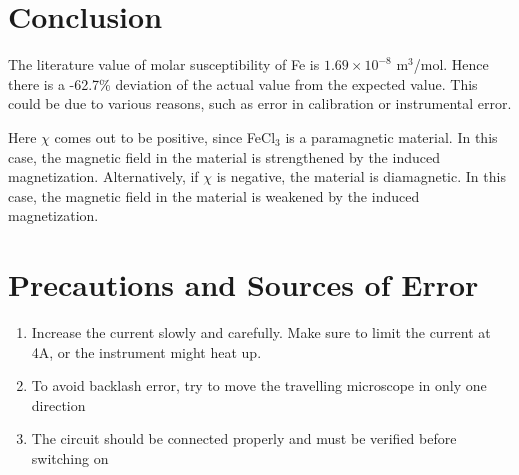 \section{Conclusion}
The literature value of molar susceptibility of Fe is $1.69\times10^{-8}$ m$^3$/mol. Hence there is a -62.7\% deviation of the actual value from the expected value. This could be due to various reasons, such as error in calibration or instrumental error.

Here $\chi$ comes out to be positive, since FeCl$_3$ is a paramagnetic material. In this case, the magnetic field in the material is strengthened by the induced magnetization. Alternatively, if $\chi$ is negative, the material is diamagnetic. In this case, the magnetic field in the material is weakened by the induced magnetization.

\section{Precautions and Sources of Error}
\begin{enumerate}
    \item Increase the current slowly and carefully. Make sure to limit the current at 4A, or the instrument might heat up.
    \item To avoid backlash error, try to move the travelling microscope in only one direction
    \item The circuit should be connected properly and must be verified before switching on
\end{enumerate}